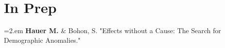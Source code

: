 %
\section{In Prep}

       \hangindent=2.em \textbf{Hauer M.} \& Bohon, S. "Effects without a Cause: The Search for Demographic Anomalies."\\

%
%








